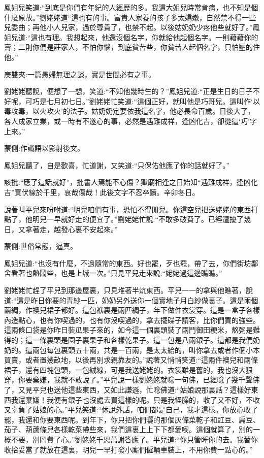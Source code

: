 \begin{parag}
    鳳姐兒笑道:“到底是你們有年紀的人經歷的多。我這大姐兒時常肯病，也不知是個什麼原故。”劉姥姥道“這也有的事。富貴人家養的孩子多太嬌嫩，自然禁不得一些兒委曲；再他小人兒家，過於尊貴了，也禁不起。以後姑奶奶少疼他些就好了。”鳳姐兒道:“這也有理。我想起來，他還沒個名字，你就給他起個名字。一則藉藉你的壽；二則你們是莊家人，不怕你惱，到底貧苦些，你貧苦人起個名字，只怕壓的住他。”\begin{note}庚雙夾:一篇愚婦無理之談，實是世間必有之事。\end{note}劉姥姥聽說，便想了一想，笑道:“不知他幾時生的？”鳳姐兒道:“正是生日的日子不好呢，可巧是七月初七日。”劉姥姥忙笑道:“這個正好，就叫他是巧哥兒。這叫作‘以毒攻毒，以火攻火’的法子。姑奶奶定要依我這名字，他必長命百歲。日後大了，各人成家立業，或一時有不遂心的事，必然是遇難成祥，逢凶化吉，卻從這‘巧’字上來。”\begin{note}蒙側:作讖語以影射後文。\end{note}
\end{parag}


\begin{parag}
    鳳姐兒聽了，自是歡喜，忙道謝，又笑道:“只保佑他應了你的話就好了。”\begin{note} 該批:“應了這話就好”，批書人焉能不心傷？獄廟相逢之日始知“遇難成祥，逢凶化吉”實伏線於千里，哀哉傷哉！此後文字不忍卒讀。辛卯冬日。\end{note}說著叫平兒來吩咐道:“明兒咱們有事，恐怕不得閒兒。你這空兒把送姥姥的東西打點了，他明兒一早就好走的便宜了。”劉姥姥忙說:“不敢多破費了。已經遭擾了幾日，又拿著走，越發心裏不安起來。”\begin{note}蒙側:世俗常態，逼真。\end{note}鳳姐兒道:“也沒有什麼，不過隨常的東西。好也罷，歹也罷，帶了去，你們街坊鄰舍看著也熱鬧些，也是上城一次。”只見平兒走來說:“姥姥過這邊瞧瞧。”
\end{parag}


\begin{parag}
    劉姥姥忙趕了平兒到那邊屋裏，只見堆著半炕東西。平兒一一的拿與他瞧著，說道:“這是昨日你要的青紗一匹，奶奶另外送你一個實地子月白紗做裏子。這是兩個繭綢，作襖兒裙子都好。這包袱裏是兩匹綢子，年下做件衣裳穿。這是一盒子各樣內造點心，也有你喫過的，也有你沒喫過的，拿去擺碟子請客，比你們買的強些。這兩條口袋是你昨日裝瓜果子來的，如今這一個裏頭裝了兩鬥御田粳米，熬粥是難得的；這一條裏頭是園子裏果子和各樣乾果子。這一包是八兩銀子。這都是我們奶奶的。這兩包每包裏頭五十兩，共是一百兩，是太太給的，叫你拿去或者作個小本買賣，或者置幾畝地，以後再別求親靠友的。”說著又悄悄笑道:“這兩件襖兒和兩條裙子，還有四塊包頭，一包絨線，可是我送姥姥的。衣裳雖是舊的，我也沒大狠穿，你要棄嫌，我就不敢說了。”平兒說一樣劉姥姥就唸一句佛，已經唸了幾千聲佛了，又見平兒也送他這些東西，又如此謙遜，忙唸佛道:“姑娘說那裏話？這樣好東西我還棄嫌！我便有銀子也沒處去買這樣的呢。只是我怪臊的，收了又不好，不收又辜負了姑娘的心。”平兒笑道:“休說外話，咱們都是自己，我才這樣。你放心收了罷，我還和你要東西呢。到年下，你只把你們曬的那個灰條菜乾子和豇豆、扁豆、茄子、葫蘆條兒各樣乾菜帶些來，我們這裏上上下下都愛喫。這個就算了，別的一概不要，別罔費了心。”劉姥姥千恩萬謝答應了。平兒道:“你只管睡你的去。我替你收拾妥當了就放在這裏，明兒一早打發小廝們僱輛車裝上，不用你費一點心的。”
\end{parag}


